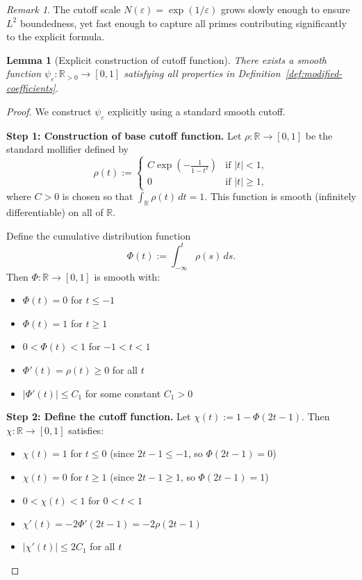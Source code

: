 ﻿\documentclass[12pt,a4paper]{article}
\newtheorem{lemma}[theorem]{Lemma}
\theoremstyle{definition}
\theoremstyle{remark}
\newtheorem{remark}[theorem]{Remark}
\newcommand{\RR}{\mathbb{R}}
\begin{document}
\begin{remark}
The cutoff scale $N(\varepsilon) = \exp(1/\varepsilon)$ grows slowly enough to ensure $L^2$ boundedness, yet fast enough to capture all primes contributing significantly to the explicit formula.
\end{remark}

\begin{lemma}[Explicit construction of cutoff function]\label{lem:cutoff-construction}
There exists a smooth function $\psi_\varepsilon : \RR_{>0} \to [0,1]$ satisfying all properties in Definition~\ref{def:modified-coefficients}.
\end{lemma}

\begin{proof}
We construct $\psi_\varepsilon$ explicitly using a standard smooth cutoff.

\textbf{Step 1: Construction of base cutoff function.}
Let $\rho : \RR \to [0,1]$ be the standard mollifier defined by
\[
  \rho(t) := \begin{cases}
    C \exp\left(-\frac{1}{1-t^2}\right) & \text{if } |t| < 1, \\
    0 & \text{if } |t| \geq 1,
  \end{cases}
\]
where $C > 0$ is chosen so that $\int_\RR \rho(t) \, dt = 1$. This function is smooth (infinitely differentiable) on all of $\RR$.

Define the cumulative distribution function
\[
  \Phi(t) := \int_{-\infty}^t \rho(s) \, ds.
\]
Then $\Phi : \RR \to [0,1]$ is smooth with:
\begin{itemize}
\item $\Phi(t) = 0$ for $t \leq -1$
\item $\Phi(t) = 1$ for $t \geq 1$
\item $0 < \Phi(t) < 1$ for $-1 < t < 1$
\item $\Phi'(t) = \rho(t) \geq 0$ for all $t$
\item $|\Phi'(t)| \leq C_1$ for some constant $C_1 > 0$
\end{itemize}

\textbf{Step 2: Define the cutoff function.}
Let $\chi(t) := 1 - \Phi(2t - 1)$. Then $\chi : \RR \to [0,1]$ satisfies:
\begin{itemize}
\item $\chi(t) = 1$ for $t \leq 0$ (since $2t - 1 \leq -1$, so $\Phi(2t-1) = 0$)
\item $\chi(t) = 0$ for $t \geq 1$ (since $2t - 1 \geq 1$, so $\Phi(2t-1) = 1$)
\item $0 < \chi(t) < 1$ for $0 < t < 1$
\item $\chi'(t) = -2\Phi'(2t-1) = -2\rho(2t-1)$
\item $|\chi'(t)| \leq 2C_1$ for all $t$
\end{itemize}


\end{proof}
\end{document}

